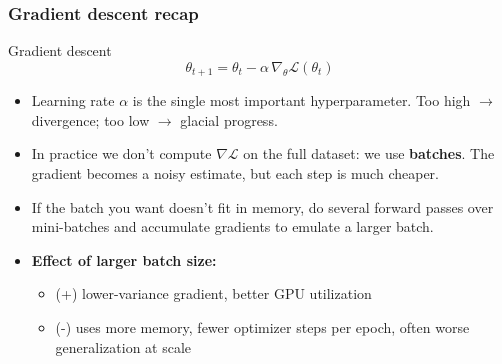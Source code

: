 \begin{frame}
\frametitle{Gradient descent recap}
\begin{block}{Gradient descent}
    $$ \theta_{t+1} = \theta_t - \alpha\, \nabla_\theta \mathcal{L}(\theta_t) $$
\end{block}
\begin{itemize}
    \pause
    \item Learning rate $\alpha$ is the single most important hyperparameter.
    Too high $\to$ divergence; too low $\to$ glacial progress.
    \pause
    \item In practice we don't compute $\nabla \mathcal{L}$ on the full
    dataset: we use \textbf{batches}. The gradient becomes a noisy
    estimate, but each step is much cheaper.
    \pause
    \item If the batch you want doesn't fit in memory, do several forward passes
    over mini-batches and accumulate gradients to emulate a larger batch.
    \pause
    \item \textbf{Effect of larger batch size:}
    \begin{itemize}
        \item (+) lower-variance gradient, better GPU utilization
        \item (-) uses more memory, fewer optimizer steps per epoch,
        often worse generalization at scale
    \end{itemize}
\end{itemize}
\end{frame}




